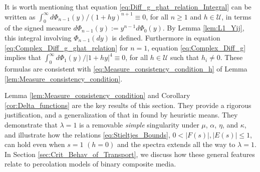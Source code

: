 \documentclass[english,12pt,jmp,graphicx]{revtex4-1}
\begin{document}
 It is worth mentioning 
that equation \eqref{eq:Diff_g_ghat_relation_Integral} can be written
as $\int_0^\infty d\Phi_{n-1}(y)/(1+hy)^{n+1}\equiv0$, for all $n\geq1$ and $h\in\mathcal{U}$, in
terms of the signed measure $d\Phi_{n-1}(y):=y^{n-1}d\Phi_0(y)$. By Lemma
\ref{lem:L1_Yij}, this integral involving 
$\Phi_{n-1}(dy)$ is defined. Furthermore in equation
\eqref{eq:Complex_Diff_g_ghat_relation} for $n=1$, equation
\eqref{eq:Complex_Diff_g} implies that $\int_0^\infty d\Phi_1(y)/|1+hy|^4\equiv0$, for 
all $h\in\mathcal{U}$ such that $h_i\neq0$. These formulas are consistent
with \eqref{eq:Measure_consistency_condition_h} of Lemma
\ref{lem:Measure_consistency_condition}.

Lemma \ref{lem:Measure_consistency_condition} and Corollary 
\ref{cor:Delta_functions} are the key results of this section. They
provide a rigorous justification, and a generalization of that in
\cite{Day:JPCM-96} found by heuristic means. They demonstrate that $\lambda=1$ is
a removable \emph{simple} singularity under $\mu$, $\alpha$, $\eta$, and $\kappa$,
and illustrate how the relations \eqref{eq:Stieltjes_Bounds},
$0<|F(s)|,|E(s)|\leq1$, can hold even when  $s=1$ $(h=0)$ and the spectra
extends all the way to $\lambda=1$. In Section
\ref{sec:Crit_Behav_of_Transport}, we discuss how these general
features relate to percolation models of binary composite media. 
       
%
\end{document}
